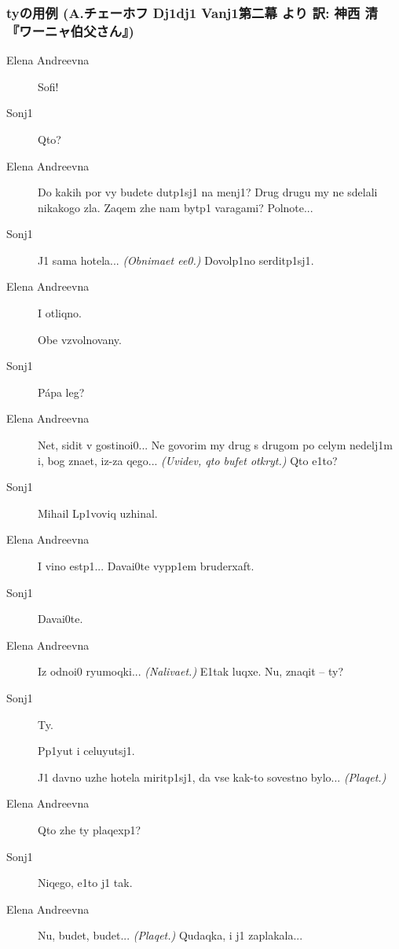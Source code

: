 \documentclass[11pt]{jsarticle}
\begin{document}
\subsubsection*{tyの用例 (A.チェーホフ \guillemotleft D{j1}d{j1} Van{j1}\guillemotright 第二幕 より 訳: 神西 清『ワーニャ伯父さん』)}
\begin{multicols}{2}
\begin{description}
\item[Elena Andreevna]
Sofi!
\item[Son{j1}]
Qto?
\item[Elena Andreevna]
Do kakih por vy budete dut{p1}s{j1} na men{j1}? Drug drugu my ne sdelali nikakogo zla. Zaqem {zh}e nam byt{p1} varagami? Polnote...
\item[Son{j1}]
{J1} sama hotela... \textit{(Obnimaet e{e0}.)} Dovol{p1}no serdit{p1}s{j1}.
\item[Elena Andreevna]
I otliqno.
\begin{center}
Obe vzvolnovany.
\end{center}
\item[Son{j1}]
P\'apa leg?
\item[Elena Andreevna]
Net, sidit v gostino{i0}... Ne govorim my drug s drugom po celym nedel{j1}m i, bog znaet, iz-za qego... \textit{(Uvidev, qto bufet otkryt.)} Qto {e1}to?
\item[Son{j1}]
Mihail L{p1}voviq u{zh}inal.
\item[Elena Andreevna]
I vino est{p1}... Dava{i0}te vyp{p1}em bruderxaft.
\item[Son{j1}]
Dava{i0}te.
\item[Elena Andreevna]
Iz odno{i0} r{yu}moqki... \textit{(Nalivaet.)} {E1}tak luqxe. Nu, znaqit \--- ty?
\item[Son{j1}]
Ty.
\begin{center}
P{p1}{yu}t i celu{yu}{t}s{j1}.
\end{center}
{J1} davno u{zh}e hotela mirit{p1}s{j1}, da vse kak-to sovestno bylo... \textit{(Plaqet.)}
\item[Elena Andreevna]
Qto {zh}e ty plaqex{p1}?
\item[Son{j1}]
Niqego, {e1}to {j1} tak.
\item[Elena Andreevna]
Nu, budet, budet... \textit{(Plaqet.)} Qudaqka, i {j1} zaplakala...
\end{description}


\end{multicols}
\end{document}
